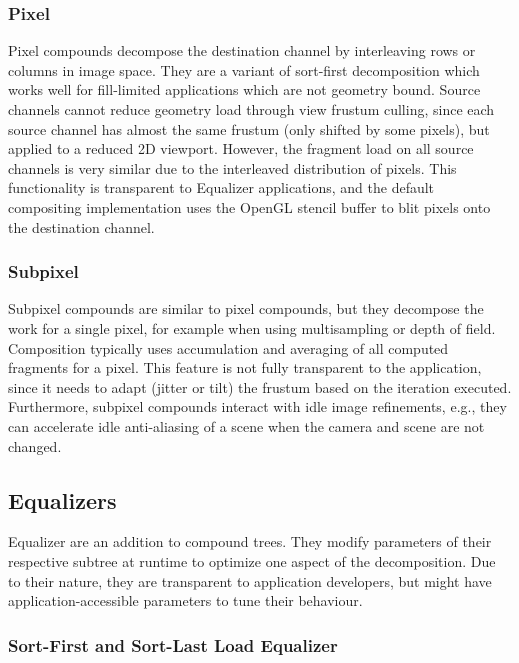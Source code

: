 \documentclass[10pt,journal,compsoc]{IEEEtran}
\begin{document}
\subsubsection{Pixel}

Pixel compounds decompose the destination channel by interleaving rows or
columns in image space. They are a variant of sort-first decomposition which
works well for fill-limited applications which are not geometry bound. Source
channels cannot reduce geometry load through view frustum culling, since each
source channel has almost the same frustum (only shifted by some pixels),
but applied to a reduced 2D viewport. However, the fragment load on all source
channels is very similar due to the interleaved distribution of pixels. This
functionality is transparent to Equalizer applications, and the default
compositing implementation uses the OpenGL stencil buffer to blit pixels onto
the destination channel.

\subsubsection{Subpixel}

Subpixel compounds are similar to pixel compounds, but they decompose the work
for a single pixel, for example when using multisampling or depth of
field. Composition typically uses accumulation and averaging of all computed
fragments for a pixel. This feature is not fully transparent to the application,
since it needs to adapt (jitter or tilt) the frustum based on the iteration
executed. Furthermore, subpixel compounds interact with idle image refinements,
e.g., they can accelerate idle anti-aliasing of a scene when the camera and
scene are not changed.

\subsection{Equalizers}

Equalizer are an addition to compound trees. They modify parameters of their
respective subtree at runtime to optimize one aspect of the decomposition. Due
to their nature, they are transparent to application developers, but might have
application-accessible parameters to tune their behaviour.

\subsubsection{Sort-First and Sort-Last Load Equalizer}
\end{document}
